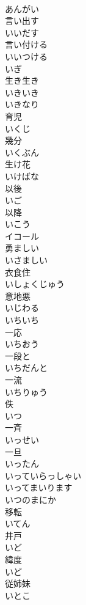 \documentclass[8pt]{extreport}
\begin{document}
\begin{CJK}{UTF8}{min}
\\	あんがい	
\\	言い出す 
\\	いいだす	
\\	言い付ける 
\\	いいつける	
\\	いぎ	
\\	生き生き 
\\	いきいき	
\\	いきなり	
\\	育児 
\\	いくじ	
\\	幾分 
\\	いくぶん	
\\	生け花 
\\	いけばな	
\\	以後 
\\	いご	
\\	以降 
\\	いこう	
\\	イコール	
\\	勇ましい 
\\	いさましい	
\\	衣食住 
\\	いしょくじゅう	
\\	意地悪 
\\	いじわる	
\\	いちいち	
\\	一応 
\\	いちおう	
\\	一段と 
\\	いちだんと	
\\	一流 
\\	いちりゅう	
\\	佚 
\\	いつ	
\\	一斉 
\\	いっせい	
\\	一旦 
\\	いったん	
\\	いっていらっしゃい	
\\	いってまいります	
\\	いつのまにか	
\\	移転 
\\	いてん	
\\	井戸 
\\	いど	
\\	緯度 
\\	いど	
\\	従姉妹 
\\	いとこ	

\end{CJK}
\end{document}
